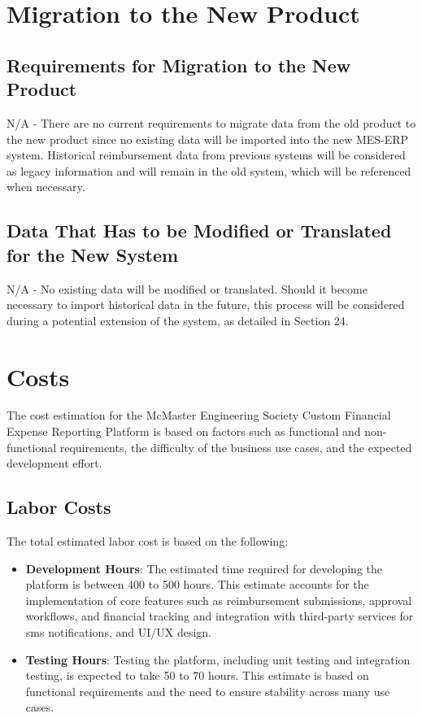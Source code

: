 \documentclass[12pt]{article}
\begin{document}
\section{Migration to the New Product}
\subsection{Requirements for Migration to the New Product}
N/A - There are no current requirements to migrate data from the old product to the new product since no existing data will be imported into the new MES-ERP system. Historical reimbursement data from previous systems will be considered as legacy information and will remain in the old system, which will be referenced when necessary.

\subsection{Data That Has to be Modified or Translated for the New System}
N/A - No existing data will be modified or translated. Should it become necessary to import historical data in the future, this process will be considered during a potential extension of the system, as detailed in Section 24.

\section{Costs}

The cost estimation for the McMaster Engineering Society Custom Financial Expense Reporting Platform is based on factors such as functional and non-functional requirements, the difficulty of the business use cases, and the expected development effort.

\subsection{Labor Costs}
The total estimated labor cost is based on the following:
\begin{itemize}
    \item \textbf{Development Hours}: The estimated time required for developing the platform is between 400 to 500 hours. This estimate accounts for the implementation of core features such as reimbursement submissions, approval workflows, and financial tracking and integration with third-party services for sms notifications, and UI/UX design.
    \item \textbf{Testing Hours}: Testing the platform, including unit testing and integration testing, is expected to take 50 to 70 hours. This estimate is based on functional requirements and the need to ensure stability across many use cases.
\end{itemize}
\end{document}
